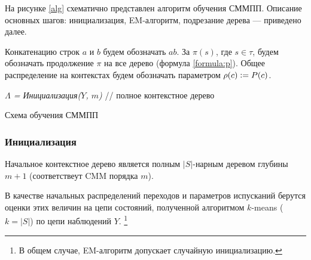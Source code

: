\documentclass{matmex-diploma-custom}
\begin{document}
На рисунке \ref{alg} схематично представлен алгоритм обучения СММПП. Описание основных шагов: инициализация, EM-алгоритм, подрезание дерева --- приведено далее.

Конкатенацию строк $a$ и $b$ будем обозначать $ab$.
За $\pi(s)$, где $s \in \tau$, будем обозначать продолжение $\pi$ на все дерево (формула \ref{formula:p}).
Общее распределение на контекстах будем обозначать параметром $\rho(c)\mathrel{\mathop:}= P(c)$.
\\

\begin{algorithm}[H]
 \textit{
 $\Lambda$ = Инициализация($Y$, $m$)
 }\;
 // полное контекстное дерево\\
 \caption{Схема обучения СММПП}
 \label{alg}
\end{algorithm}


\subsubsection{Инициализация}
Начальное контекстное дерево является полным $|S|$-нарным деревом глубины $m+1$ (соответствеут CMM порядка $m$).

В качестве начальных распределений переходов и параметров испусканий берутся оценки этих величин на цепи состояний, полученной алгоритмом $k$-means ($k=|S|$) по цепи наблюдений $Y$. \footnote{В общем случае, EM-алгоритм допускает случайную инициализацию.}
\end{document}

